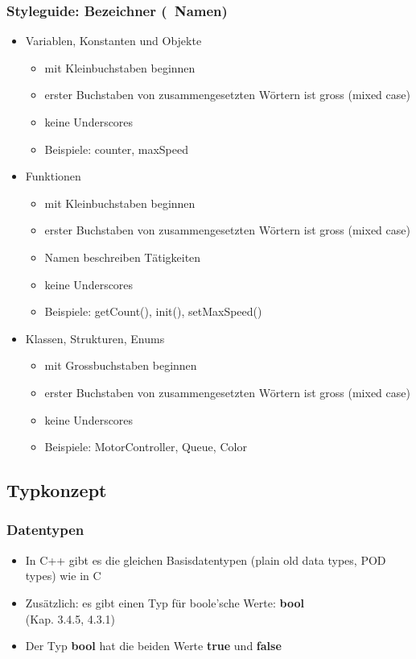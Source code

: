 \subsubsection{Styleguide: Bezeichner (~Namen)\hfill}
\label{sec:unterunterabschnitt}
\begin{itemize}
	\item Variablen, Konstanten und Objekte
	\begin{itemize}
		\item mit Kleinbuchstaben beginnen
		\item erster Buchstaben von zusammengesetzten Wörtern ist gross (mixed case)
		\item keine Underscores
		\\
		\item[\-] Beispiele: counter, maxSpeed
		\\
	\end{itemize}
	\item Funktionen
	\begin{itemize}
		\item mit Kleinbuchstaben beginnen
		\item erster Buchstaben von zusammengesetzten Wörtern ist gross (mixed case)
		\item Namen beschreiben Tätigkeiten
		\item keine Underscores
		\\
		\item[\-] Beispiele: getCount(), init(), setMaxSpeed()
		\\
	\end{itemize}
	\item Klassen, Strukturen, Enums
	\begin{itemize}
		\item mit Grossbuchstaben beginnen
		\item erster Buchstaben von zusammengesetzten Wörtern ist gross (mixed case)
		\item keine Underscores
		\\
		\item[\-] Beispiele: MotorController, Queue, Color
	\end{itemize}
\end{itemize}

\subsection{Typkonzept\hfill}
\label{sec:unterabschnitt}

\subsubsection{Datentypen\hfill}
\label{sec::unterunterabschnitt}
\begin{itemize}
	\item In C++ gibt es die gleichen Basisdatentypen (plain old data types, POD types) wie in C
	\item Zusätzlich: es gibt einen Typ für boole'sche Werte: \textbf{bool}
		\\ \small{(Kap. 3.4.5, 4.3.1)}
	\item Der Typ \textbf{bool} hat die beiden Werte \textbf{true} und \textbf{false}
\end{itemize}

